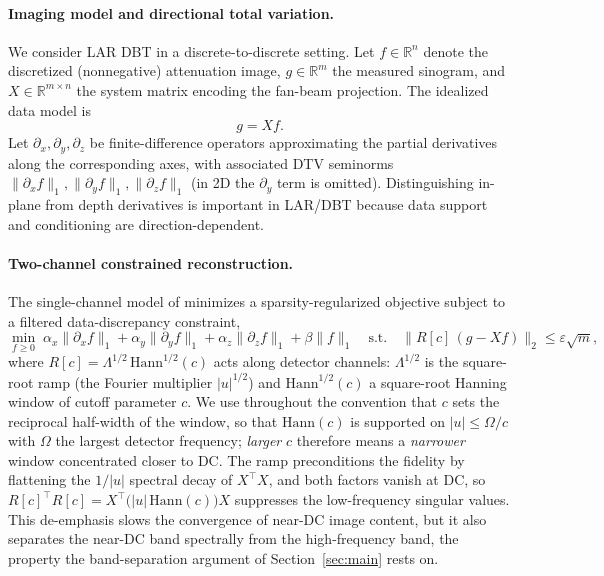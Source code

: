 \documentclass{article}
\newcommand{\R}{\mathbb{R}}
\begin{document}
\paragraph{Imaging model and directional total variation.}
We consider LAR DBT in a discrete-to-discrete setting. Let $f\in\R^{n}$ denote the discretized (nonnegative) attenuation image, $g\in\R^{m}$ the measured sinogram, and $X\in\R^{m\times n}$ the system matrix encoding the fan-beam projection. The idealized data model is
\begin{equation}
\label{eq:fwd}
g = X f .
\end{equation}
Let $\partial_x,\partial_y,\partial_z$ be finite-difference operators approximating the partial derivatives along the corresponding axes, with associated DTV seminorms $\|\partial_x f\|_1,\|\partial_y f\|_1,\|\partial_z f\|_1$ (in 2D the $\partial_y$ term is omitted). Distinguishing in-plane from depth derivatives is important in LAR/DBT because data support and conditioning are direction-dependent.

\paragraph{Two-channel constrained reconstruction.}
The single-channel model of \citet{sidky2025accurate} minimizes a sparsity-regularized objective subject to a filtered data-discrepancy constraint,
\begin{equation}
\label{eq:single}
\min_{f\ge 0}\;
\alpha_x\|\partial_x f\|_1+\alpha_y\|\partial_y f\|_1+\alpha_z\|\partial_z f\|_1+\beta\|f\|_1
\quad\text{s.t.}\quad
\big\|R[c]\,(g-Xf)\big\|_2\le\varepsilon\sqrt{m},
\end{equation}
where $R[c]=\Lambda^{1/2}\,\mathrm{Hann}^{1/2}(c)$ acts along detector channels: $\Lambda^{1/2}$ is the square-root ramp (the Fourier multiplier $|u|^{1/2}$) and $\mathrm{Hann}^{1/2}(c)$ a square-root Hanning window of cutoff parameter $c$. We use throughout the convention that $c$ sets the reciprocal half-width of the window, so that $\mathrm{Hann}(c)$ is supported on $|u|\le\Omega/c$ with $\Omega$ the largest detector frequency; \emph{larger} $c$ therefore means a \emph{narrower} window concentrated closer to DC. The ramp preconditions the fidelity by flattening the $1/|u|$ spectral decay of $X^\top X$, and both factors vanish at DC, so $R[c]^\top R[c]=X^\top\big(|u|\,\mathrm{Hann}(c)\big)X$ suppresses the low-frequency singular values. This de-emphasis slows the convergence of near-DC image content, but it also separates the near-DC band spectrally from the high-frequency band, the property the band-separation argument of Section~\ref{sec:main} rests on.
\end{document}
